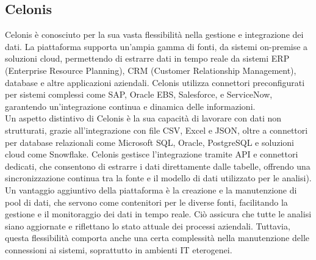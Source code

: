 \documentclass{article}
\begin{document}
\subsection{Celonis}
Celonis è conosciuto per la sua vasta flessibilità nella gestione e integrazione dei dati. La piattaforma supporta un'ampia gamma di fonti, da sistemi on-premise a soluzioni cloud, permettendo di estrarre dati in tempo reale da sistemi ERP (Enterprise Resource Planning), CRM (Customer Relationship Management), database e altre applicazioni aziendali. Celonis utilizza connettori preconfigurati per sistemi complessi come SAP, Oracle EBS, Salesforce, e ServiceNow, garantendo un'integrazione continua e dinamica delle informazioni.\\
Un aspetto distintivo di Celonis è la sua capacità di lavorare con dati non strutturati, grazie all'integrazione con file CSV, Excel e JSON, oltre a connettori per database relazionali come Microsoft SQL, Oracle, PostgreSQL e soluzioni cloud come Snowflake. Celonis gestisce l'integrazione tramite API e connettori dedicati, che consentono di estrarre i dati direttamente dalle tabelle, offrendo una sincronizzazione continua tra la fonte e il modello di dati utilizzato per le analisi).\\
Un vantaggio aggiuntivo della piattaforma è la creazione e la manutenzione di pool di dati, che servono come contenitori per le diverse fonti, facilitando la gestione e il monitoraggio dei dati in tempo reale. Ciò assicura che tutte le analisi siano aggiornate e riflettano lo stato attuale dei processi aziendali. Tuttavia, questa flessibilità comporta anche una certa complessità nella manutenzione delle connessioni ai sistemi, soprattutto in ambienti IT eterogenei.\\
\end{document}
